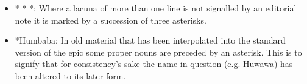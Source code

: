 \documentclass{article}
\begin{document}
\begin{small}
\begin{itemize}[
    label=,
    leftmargin=1.5em,
    itemindent=-1.5em,
    itemsep=0.25em,
    parsep=0em
]
    \item[] * * *: Where a lacuna of more than one line is not signalled by an editorial note it is
marked by a succession of three asterisks.


    \item[] *Humbaba: In old material that has been interpolated into the standard
version of the epic some proper nouns are preceded by an asterisk. This
is to signify that for consistency's sake the name in question (e.g.
Huwawa) has been altered to its later form.

\end{itemize}

\end{small}

\end{document}
